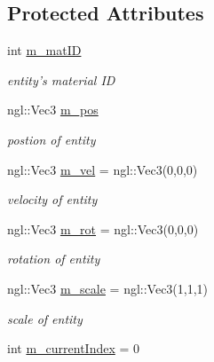 \subsection*{Protected Attributes}
\begin{DoxyCompactItemize}
\item 
\hypertarget{class_entity_a63fddde23301d8f868909fa77ea07d56}{int \hyperlink{class_entity_a63fddde23301d8f868909fa77ea07d56}{m\-\_\-mat\-I\-D}}\label{class_entity_a63fddde23301d8f868909fa77ea07d56}

\begin{DoxyCompactList}\small\item\em entity's material I\-D \end{DoxyCompactList}\item 
\hypertarget{class_entity_adc3eccf96ce5804512cd9d9a343d98f5}{ngl\-::\-Vec3 \hyperlink{class_entity_adc3eccf96ce5804512cd9d9a343d98f5}{m\-\_\-pos}}\label{class_entity_adc3eccf96ce5804512cd9d9a343d98f5}

\begin{DoxyCompactList}\small\item\em postion of entity \end{DoxyCompactList}\item 
\hypertarget{class_entity_ad2b217813dfbe55d39d6438b9b011d97}{ngl\-::\-Vec3 \hyperlink{class_entity_ad2b217813dfbe55d39d6438b9b011d97}{m\-\_\-vel} = ngl\-::\-Vec3(0,0,0)}\label{class_entity_ad2b217813dfbe55d39d6438b9b011d97}

\begin{DoxyCompactList}\small\item\em velocity of entity \end{DoxyCompactList}\item 
\hypertarget{class_entity_a7d345e8fda849e4f3f330289497c0955}{ngl\-::\-Vec3 \hyperlink{class_entity_a7d345e8fda849e4f3f330289497c0955}{m\-\_\-rot} = ngl\-::\-Vec3(0,0,0)}\label{class_entity_a7d345e8fda849e4f3f330289497c0955}

\begin{DoxyCompactList}\small\item\em rotation of entity \end{DoxyCompactList}\item 
\hypertarget{class_entity_a129334046e89817c024c29c81516843f}{ngl\-::\-Vec3 \hyperlink{class_entity_a129334046e89817c024c29c81516843f}{m\-\_\-scale} = ngl\-::\-Vec3(1,1,1)}\label{class_entity_a129334046e89817c024c29c81516843f}

\begin{DoxyCompactList}\small\item\em scale of entity \end{DoxyCompactList}\item 
\hypertarget{class_entity_a78efff1696f4c13a6f88b2fac836a02d}{int \hyperlink{class_entity_a78efff1696f4c13a6f88b2fac836a02d}{m\-\_\-current\-Index} = 0}\label{class_entity_a78efff1696f4c13a6f88b2fac836a02d}


\end{DoxyCompactItemize}
